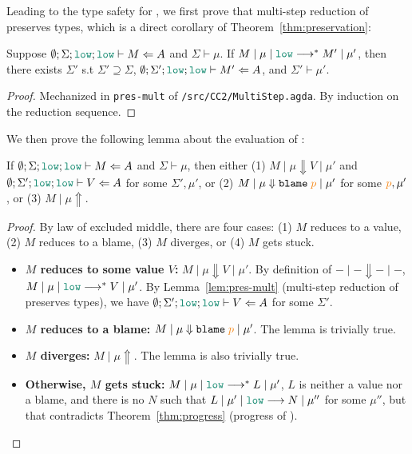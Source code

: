Leading to the type safety for \Surface, we first prove that multi-step
reduction of \CC preserves types, which is a direct corollary of
Theorem~\ref{thm:preservation}:

\begin{lemma}
  \label{lem:pres-mult}
  Suppose $\emptyset ; \Sigma ; \low ; \low \vdash M \Leftarrow A$ and $\Sigma \vdash \mu$.
  If $\reducemult{M}{\mu}{\low}{M'}{\mu'}$,
  then there exists $\Sigma'$ s.t $\Sigma' \supseteq \Sigma$, $\emptyset ; \Sigma' ; \low ; \low \vdash M' \Leftarrow A$,
  and $\Sigma' \vdash \mu'$.
\end{lemma}
\begin{proof}
  Mechanized in \texttt{pres-mult} of \texttt{/src/CC2/MultiStep.agda}. By
  induction on the reduction sequence.
\end{proof}

We then prove the following lemma about the evaluation of \CC:

\begin{lemma}
  \label{lem:pres-bigstep}
  If $\emptyset ; \Sigma ; \low ; \low \vdash M \Leftarrow A$ and $\Sigma \vdash
  \mu$, then either (1) $M \mid \mu \Downarrow V \mid \mu'$ and $\emptyset ;
  \Sigma' ; \low ; \low \vdash V \Leftarrow A$ for some $\Sigma', \mu'$, or (2)
  $M \mid \mu \Downarrow \blame{p} \mid \mu'$ for some $\bl{p}, \mu'$, or (3) $M
  \mid \mu \Uparrow$.
\end{lemma}
\begin{proof}
  By law of excluded middle, there are four cases: (1) $M$ reduces to a value,
  (2) $M$ reduces to a blame, (3) $M$ diverges, or (4) $M$ gets stuck.
  \begin{itemize}
    \item \textbf{$M$ reduces to some value $V$:} $M \mid \mu \Downarrow V \mid
      \mu'$. By definition of ${-}\mid{-}\Downarrow{-}\mid{-}$,
      $\reducemult{M}{\mu}{\low}{V}{\mu'}$. By Lemma~\ref{lem:pres-mult}
      (multi-step reduction of \CC preserves types), we have $\emptyset ; \Sigma' ;
      \low ; \low \vdash V \Leftarrow A$ for some $\Sigma'$.
    \item \textbf{$M$ reduces to a blame:} $M \mid \mu \Downarrow \blame{p} \mid
      \mu'$. The lemma is trivially true.
    \item \textbf{$M$ diverges:} $M \mid \mu \Uparrow$. The lemma is also
      trivially true.
    \item \textbf{Otherwise, $M$ gets stuck:}
      $\reducemult{M}{\mu}{\low}{L}{\mu'}$, $L$ is neither a value nor a blame,
      and there is no $N$ such that $\reduce{L}{\mu'}{\low}{N}{\mu''}$ for some
      $\mu''$, but that contradicts Theorem~\ref{thm:progress} (progress of \CC).
  \end{itemize}
\end{proof}

